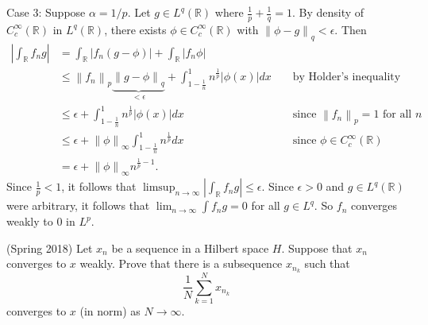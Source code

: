 \documentclass{exam}
\theoremstyle{problemstyle}
\newcommand{\norm}[1]{\left\lVert#1\right\rVert} %
\newcommand{\1}[1]{\textbf{1}_{\left[#1\right]}} %
\def\R{\mathbb{R}} %
\begin{document}
\begin{questions}
\begin{solution}
  Case 3: Suppose $\alpha=1/p$. Let $g\in L^{q}(\R)$ where $\frac{1}{p}+\frac{1}{q}=1$. By density of $C_{c}^{\infty}(\R)$ in $L^{q}(\R)$, there exists $\phi\in C_{c}^{\infty}(\R)$ with $\norm{\phi-g}_{q}<\epsilon$. Then
  \begin{align*}
    \left|\int_{\R }f_{n}g\right|
    &= \int_{\R} |f_{n}(g-\phi)| + \int_{\R} |f_{n}\phi|\\
    &\leq \norm{f_{n}}_{p}\underbrace{\norm{g-\phi}_{q}}_{<\epsilon} + \int_{1-\frac{1}{n}}^{1}n^{\frac{1}{p}}|\phi(x)|dx
    &&\text{ by Holder's inequality}\\
    &\leq \epsilon + \int_{1-\frac{1}{n}}^{1}n^{\frac{1}{p}}|\phi(x)|dx
    &&\text{ since }\norm{f_{n}}_{p}= 1\text{ for all }n\\
    &\leq \epsilon + \norm{\phi}_{\infty}\int_{1-\frac{1}{n}}^{1}n^{\frac{1}{p}}dx
    &&\text{ since }\phi\in C_{c}^{\infty}(\R)\\
    &= \epsilon + \norm{\phi}_{\infty}n^{\frac{1}{p}-1}.
  \end{align*}
  Since $\frac{1}{p}<1$, it follows that $\limsup_{n\to\infty}\left| \int_{\R}f_{n}g\right| \leq \epsilon$. Since $\epsilon>0$ and $g\in L^{q}(\R)$ were arbitrary, it follows that $\lim_{n\to\infty} \int f_{n}g = 0$ for all $g\in L^{q}$. So $f_{n}$ converges weakly to $0$ in $L^{p}$.
\end{solution}


\item (Spring 2018) Let $x_{n}$ be a sequence in a Hilbert space $H$. Suppose that $x_{n}$ converges to $x$ weakly. Prove that there is a subsequence $x_{n_{k}}$ such that
\begin{equation*}
  \frac{1}{N}\sum_{k=1}^{N}x_{n_{k}}
\end{equation*}
converges to $x$ (in norm) as $N\to\infty$. 


\end{questions}
\end{document}
